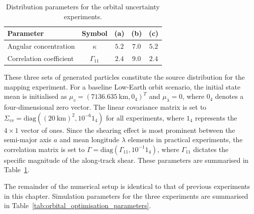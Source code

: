 \begin{table}[htbp]
    \centering
    \caption{Distribution parameters for the orbital uncertainty experiments.}
    \begin{tabular}{lcccc}
        \toprule
        \textbf{Parameter} & \textbf{Symbol} & \textbf{(a)} & \textbf{(b)} & \textbf{(c)} \\
        \midrule
        Angular concentration & $\kappa$            & $5.2$ & $7.0$ & $5.2$ \\
        Correlation coefficient & $\Gamma_{11}$     & $2.4$ & $9.0$ & $2.4$ \\
        \bottomrule
    \end{tabular}
    \label{tab:orbital_gvm_parameters}
\end{table}

These three sets of generated particles constitute the source distribution for the mapping experiment. For a baseline Low-Earth orbit scenario, the initial state mean is initialised as $\mu_v = (\SI{7136.635}{\kilo\metre}, {0}_4)^T$ and $\mu_\lambda = 0$, where ${0}_4$ denotes a four-dimensional zero vector. The linear covariance matrix is set to $\Sigma_{vv} = \mathrm{diag}((\SI{20}{\kilo\metre})^2, 10^{-6}{1}_4)$ for all experiments, where ${1}_4$ represents the $4 \times 1$ vector of ones. Since the shearing effect is most prominent between the semi-major axis $a$ and mean longitude $\lambda$ elements in practical experiments, the correlation matrix is set to $\Gamma = \mathrm{diag}(\Gamma_{11}, 10^{-1}{1}_4)$, where $\Gamma_{11}$ dictates the specific magnitude of the along-track shear. These parameters are summarised in Table~\ref{tab:orbital_gvm_parameters}.

The remainder of the numerical setup is identical to that of previous experiments in this chapter. Simulation parameters for the three experiments are summarised in Table~\ref{tab:orbital_optimisation_parameters}.

